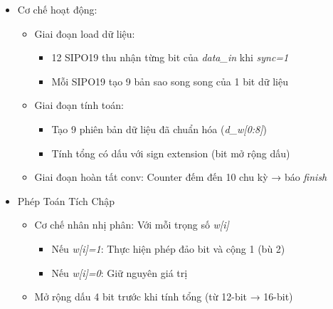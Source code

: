 \begin{itemize}
    \item Cơ chế hoạt động: 
    \begin{itemize}
        \item Giai đoạn load dữ liệu:
        \begin{itemize}
            \item 12 SIPO19 thu nhận từng bit của \textit{data\_in} khi \textit{sync=1}
            \item Mỗi SIPO19 tạo 9 bản sao song song của 1 bit dữ liệu
        \end{itemize}
        \item Giai đoạn tính toán:
        \begin{itemize}
            \item Tạo 9 phiên bản dữ liệu đã chuẩn hóa (\textit{d\_w[0:8]})
            \item Tính tổng có dấu với sign extension (bit mở rộng dấu)
        \end{itemize}
        \item Giai đoạn hoàn tất conv: Counter đếm đến 10 chu kỳ → báo \textit{finish}
    \end{itemize}
    \item Phép Toán Tích Chập
    \begin{itemize}
        \item Cơ chế nhân nhị phân: Với mỗi trọng số \textit{w[i]}
        \begin{itemize}
            \item Nếu \textit{w[i]=1}: Thực hiện phép đảo bit và cộng 1 (bù 2)
            \item Nếu \textit{w[i]=0}: Giữ nguyên giá trị
        \end{itemize}
        \item Mở rộng dấu 4 bit trước khi tính tổng (từ 12-bit → 16-bit)
    \end{itemize}
\end{itemize}


